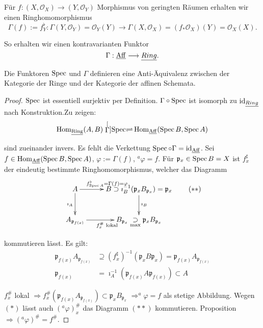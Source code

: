 Für $f:(X,\mathcal{O}_{X})\rightarrow(Y,\mathcal{O}_{Y})$ Morphismus
von geringten Räumen erhalten wir einen Ringhomomorphismus
\[
  \Gamma(f):=f_{Y}^{\flat}:\Gamma(Y,\mathcal{O}_{Y})=\mathcal{O}_{Y}(Y)\rightarrow\Gamma(X,\mathcal{O}_{X})=(f_{\ast}\mathcal{O}_{X})(Y)=\mathcal{O}_{X}(X).
\]

So erhalten wir einen kontravarianten Funktor
\[
  \Gamma:\operatorname{\underline{Aff}}\longrightarrow\underline{Ring}.
\]

\begin{thm}[35]
  Die Funktoren $\operatorname{Spec}$ und $\Gamma$ definieren eine Anti-Äquivalenz
  zwischen der Kategorie der Ringe und der Kategorie der affinen Schemata.
\end{thm}

\begin{proof}
  $\operatorname{Spec}$ ist essentiell surjektiv per Definition. $\Gamma\circ\operatorname{Spec}$
  ist isomorph zu $\operatorname{\mathrm{id}}_{\underline{Ring}}$ nach Konstruktion.Zu zeigen:
  \[
    \operatorname{\mathrm{Hom}}_{\operatorname{\underline{Ring}}}(A,B)\stackrel[\Gamma]{\operatorname{Spec}}{\rightleftharpoons}\operatorname{\mathrm{Hom}}_{\operatorname{\underline{Aff}}}(\operatorname{Spec} B,\operatorname{Spec} A)
  \]

  sind zueinander invers. Es fehlt die Verkettung $\operatorname{Spec}\circ\Gamma=\operatorname{\mathrm{id}}_{\operatorname{\underline{Aff}}}$.
  Sei $f\in\operatorname{\mathrm{Hom}}_{\operatorname{\underline{Aff}}}(\operatorname{Spec} B,\operatorname{Spec} A)$, $\varphi:=\Gamma(f)$, $^{a}\varphi=f$.
  Für $\mathfrak{p}_{x}\in\operatorname{Spec} B=X$ ist $f_{x}^{\sharp}$ der eindeutig
  bestimmte Ringhomomorphismus, welcher das Diagramm
  \[
    \xymatrix{A\ar[r]^{f_{\Spec A}^{\flat}=\Gamma(f)=\varphi}\ar[d]_{\imath_{A}} & B\ar[d]^{\imath_{B}}\supset\imath_{B}^{-1}(\mathfrak{p}_{x}B_{\mathfrak{p}_{x}})=\mathfrak{p}_{x}\\
      A_{\mathfrak{p}_{f(x)}}\ar[r]_{f_{x}^{\#}\text{ lokal}} & B_{\mathfrak{p}_{x}}\underset{\max}{\supset}\mathfrak{p}_{x}B_{\mathfrak{p}_{x}}
    }
    \qquad(**)
  \]

  kommutieren lässt. Es gilt:
  \begin{align*}
    \mathfrak{p}_{f(x)}A_{\mathfrak{p}_{f(x)}} & \supseteq(f_{x}^{\sharp})^{-1}(\mathfrak{p}_{x}B\mathfrak{p}_{x})=\mathfrak{p}_{f(x)}A_{\mathfrak{p}_{f(x)}}\\
    \mathfrak{p}_{f(x)} & =\imath_{A}^{-1}(\mathfrak{p}_{f(x)}A\mathfrak{p}_{f(x)})\subset A
  \end{align*}

  $f_{x}^{\#}$ lokal $\Longrightarrow f_{x}^{\#}(\mathfrak{p}_{f(x)}A_{\mathfrak{p}_{f(x)}})\subset\mathfrak{p}_{x}B_{\mathfrak{p}_{x}}$
  $\Longrightarrow^{a}\varphi=f$ als stetige Abbildung. Wegen $(*)$
  lässt auch $(^{a}\varphi)_{x}^{\#}$ das Diagramm $(**)$ kommutieren.
  Proposition $\Longrightarrow(^{a}\varphi)^{\#}=f^{\#}$.
\end{proof}
